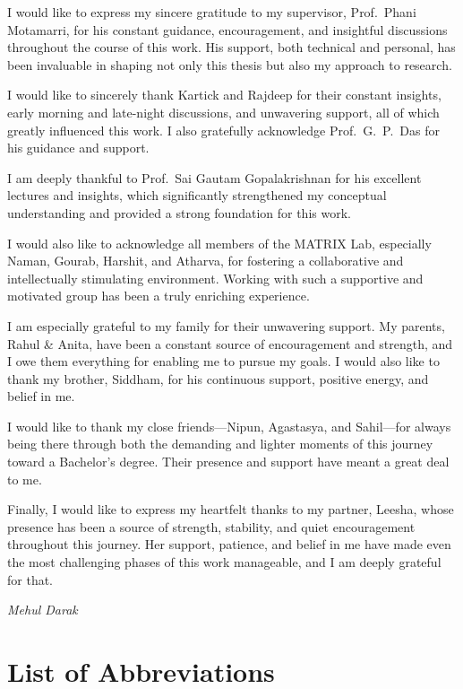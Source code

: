 \documentclass[12pt,a4paper,oneside]{book}
\begin{document}
\hspace{5pt}
I would like to express my sincere gratitude to my supervisor, Prof.~Phani Motamarri, for his constant guidance, encouragement, and insightful discussions throughout the course of this work. His support, both technical and personal, has been invaluable in shaping not only this thesis but also my approach to research.

I would like to sincerely thank Kartick and Rajdeep for their constant insights, early morning and late-night discussions, and unwavering support, all of which greatly influenced this work. I also gratefully acknowledge Prof.~G.~P.~Das for his guidance and support.

I am deeply thankful to Prof.~Sai Gautam Gopalakrishnan for his excellent lectures and insights, which significantly strengthened my conceptual understanding and provided a strong foundation for this work.

I would also like to acknowledge all members of the MATRIX Lab, especially Naman, Gourab, Harshit, and Atharva, for fostering a collaborative and intellectually stimulating environment. Working with such a supportive and motivated group has been a truly enriching experience.

I am especially grateful to my family for their unwavering support. My parents, Rahul \& Anita, have been a constant source of encouragement and strength, and I owe them everything for enabling me to pursue my goals. I would also like to thank my brother, Siddham, for his continuous support, positive energy, and belief in me.

I would like to thank my close friends---Nipun, Agastasya, and Sahil---for always being there through both the demanding and lighter moments of this journey toward a Bachelor's degree. Their presence and support have meant a great deal to me.

Finally, I would like to express my heartfelt thanks to my partner, Leesha, whose presence has been a source of strength, stability, and quiet encouragement throughout this journey. Her support, patience, and belief in me have made even the most challenging phases of this work manageable, and I am deeply grateful for that.

\hfill
\textit{Mehul Darak}

\tableofcontents

\listoffigures
{}

\listoftables
{}
\chapter*{\centering List of Abbreviations}
\end{document}
